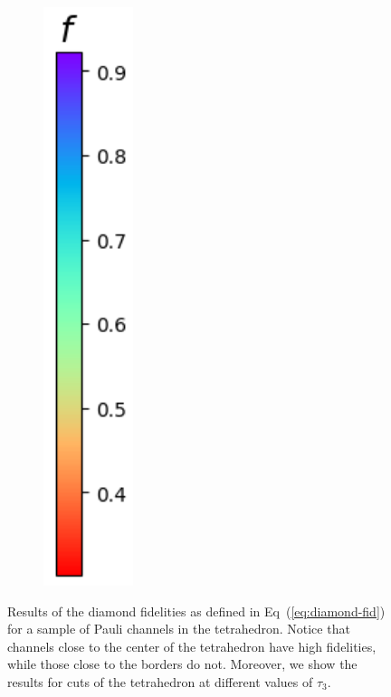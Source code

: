 \documentclass[10pt,letterpaper]{article} %
\newcommand{\eref}[1]{Eq~(\ref{#1})}
\begin{document}
\begin{figure}
\begin{subfigure}{0.9\textwidth}
\end{subfigure}%
\begin{subfigure}{0.1\textwidth}
\includegraphics[width=.8\columnwidth]{images/col-2.png} \\ [2ex]
\end{subfigure}
\caption{Results of the diamond fidelities as defined in \eref{eq:diamond-fid}
for a sample of Pauli channels in the tetrahedron.  Notice that channels close
to the center of the tetrahedron have high fidelities, while those close to the
borders do not.  Moreover, we show the results for cuts of the tetrahedron at
different values of $\tau_3$.}
\label{fig:fids}
\end{figure} %
\end{document}
